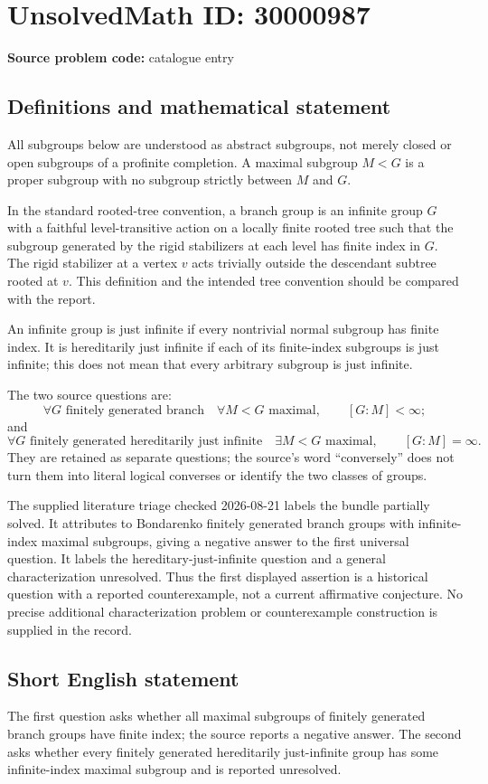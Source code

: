\documentclass[11pt]{article}
\begin{document}
\section*{UnsolvedMath ID: 30000987}
\textbf{Source problem code:} catalogue entry
\subsection{Definitions and mathematical statement}
All subgroups below are understood as abstract subgroups, not merely closed or open subgroups of a profinite completion. A maximal subgroup $M<G$ is a proper subgroup with no subgroup strictly between $M$ and $G$.

In the standard rooted-tree convention, a branch group is an infinite group $G$ with a faithful level-transitive action on a locally finite rooted tree such that the subgroup generated by the rigid stabilizers at each level has finite index in $G$. The rigid stabilizer at a vertex $v$ acts trivially outside the descendant subtree rooted at $v$. This definition and the intended tree convention should be compared with the report.

An infinite group is just infinite if every nontrivial normal subgroup has finite index. It is hereditarily just infinite if each of its finite-index subgroups is just infinite; this does not mean that every arbitrary subgroup is just infinite.

The two source questions are:
\[
\forall G\text{ finitely generated branch}\quad
\forall M<G\text{ maximal},\qquad [G:M]<\infty;
\]
and
\[
\forall G\text{ finitely generated hereditarily just infinite}\quad
\exists M<G\text{ maximal},\qquad [G:M]=\infty.
\]
They are retained as separate questions; the source's word ``conversely'' does not turn them into literal logical converses or identify the two classes of groups.

The supplied literature triage checked 2026-08-21 labels the bundle partially solved. It attributes to Bondarenko finitely generated branch groups with infinite-index maximal subgroups, giving a negative answer to the first universal question. It labels the hereditary-just-infinite question and a general characterization unresolved. Thus the first displayed assertion is a historical question with a reported counterexample, not a current affirmative conjecture. No precise additional characterization problem or counterexample construction is supplied in the record.
\subsection{Short English statement}
The first question asks whether all maximal subgroups of finitely generated branch groups have finite index; the source reports a negative answer. The second asks whether every finitely generated hereditarily just-infinite group has some infinite-index maximal subgroup and is reported unresolved.
\end{document}
